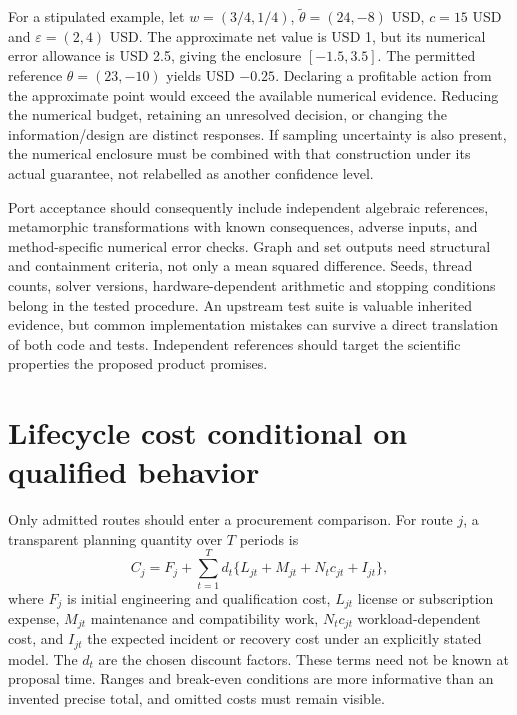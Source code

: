 For a stipulated example, let \(w=(3/4,1/4)\),
\(\widetilde\theta=(24,-8)\) USD, \(c=15\) USD and
\(\varepsilon=(2,4)\) USD. The approximate net value is USD 1, but its
numerical error allowance is USD 2.5, giving the enclosure
\([-1.5,3.5]\). The permitted reference \(\theta=(23,-10)\) yields USD
\(-0.25\). Declaring a profitable action from the approximate point would
exceed the available numerical evidence. Reducing the numerical budget,
retaining an unresolved decision, or changing the information/design are
distinct responses. If sampling uncertainty is also present, the numerical
enclosure must be combined with that construction under its actual guarantee,
not relabelled as another confidence level.
\citep{exec16_s10_exact}

Port acceptance should consequently include independent algebraic references,
metamorphic transformations with known consequences, adverse inputs, and
method-specific numerical error checks. Graph and set outputs need structural
and containment criteria, not only a mean squared difference. Seeds, thread
counts, solver versions, hardware-dependent arithmetic and stopping conditions
belong in the tested procedure. An upstream test suite is valuable inherited
evidence, but common implementation mistakes can survive a direct translation
of both code and tests. Independent references should target the scientific
properties the proposed product promises.

\section{Lifecycle cost conditional on qualified behavior}

Only admitted routes should enter a procurement comparison. For route \(j\),
a transparent planning quantity over \(T\) periods is
\[
 C_j=F_j+\sum_{t=1}^{T}d_t
  \{L_{jt}+M_{jt}+N_t c_{jt}+I_{jt}\},
\]
where \(F_j\) is initial engineering and qualification cost, \(L_{jt}\)
license or subscription expense, \(M_{jt}\) maintenance and compatibility
work, \(N_t c_{jt}\) workload-dependent cost, and \(I_{jt}\) the expected
incident or recovery cost under an explicitly stated model. The \(d_t\)
are the chosen discount factors. These terms need not be known at proposal
time. Ranges and break-even conditions are more informative than an invented
precise total, and omitted costs must remain visible.

